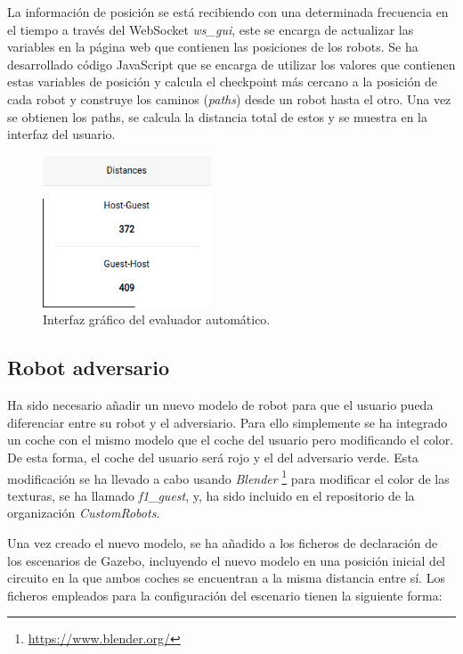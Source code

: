 \documentclass[a4paper, 12pt]{book}
\begin{document}
La información de posición se está recibiendo con una determinada frecuencia en el tiempo a través del WebSocket \emph{ws\_gui}, este se encarga de actualizar las variables en la página web que contienen las posiciones de los robots. Se ha desarrollado código JavaScript que se encarga de utilizar los valores que contienen estas variables de posición y calcula el checkpoint más cercano a la posición de cada robot y construye los caminos (\emph{paths}) desde un robot hasta el otro. Una vez se obtienen los paths, se calcula la distancia total de estos y se muestra en la interfaz del usuario.

\begin{figure}[H]
	\centering
    \includegraphics[width=5cm]{img/evaluator_follow_line.png}
    \caption{Interfaz gráfico del evaluador automático.}
    \label{figura:keyhandler}
\end{figure}

\subsection{Robot adversario}
\label{follow_line_game_adversario}

Ha sido necesario añadir un nuevo modelo de robot para que el usuario pueda diferenciar entre su robot y el adversiario. Para ello simplemente se ha integrado un coche con el mismo modelo que el coche del usuario pero modificando el color. De esta forma, el coche del usuario será rojo y el del adversario verde. Esta modificación se ha llevado a cabo usando \emph{Blender} \footnote{\url{https://www.blender.org/}} para modificar el color de las texturas, se ha llamado \emph{f1\_guest}, y, ha sido  incluido en el repositorio de la organización \emph{CustomRobots}.

Una vez creado el nuevo modelo, se ha añadido a los ficheros de declaración de los escenarios de Gazebo, incluyendo el nuevo modelo en una posición inicial del circuito en la que ambos coches se encuentran a la misma distancia entre sí. Los ficheros empleados para la configuración del escenario tienen la siguiente forma:
\end{document}
